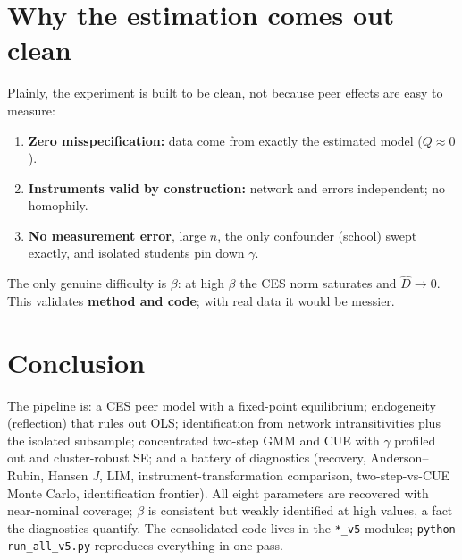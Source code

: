 \documentclass[11pt]{article}
\begin{document}
\section{Why the estimation comes out clean}
Plainly, the experiment is built to be clean, not because peer effects are easy to measure:
\begin{enumerate}\itemsep2pt
\item \textbf{Zero misspecification:} data come from exactly the estimated model ($Q\approx0$).
\item \textbf{Instruments valid by construction:} network and errors independent; no homophily.
\item \textbf{No measurement error}, large $n$, the only confounder (school) swept exactly, and isolated students pin down $\gamma$.
\end{enumerate}
The only genuine difficulty is $\beta$: at high $\beta$ the CES norm saturates and $\widehat D\to 0$. This validates \textbf{method and code}; with real data it would be messier.

\section{Conclusion}
The pipeline is: a CES peer model with a fixed-point equilibrium; endogeneity (reflection) that rules out OLS; identification from network intransitivities plus the isolated subsample; concentrated two-step GMM and CUE with $\gamma$ profiled out and cluster-robust SE; and a battery of diagnostics (recovery, Anderson--Rubin, Hansen $J$, LIM, instrument-transformation comparison, two-step-vs-CUE Monte Carlo, identification frontier). All eight parameters are recovered with near-nominal coverage; $\beta$ is consistent but weakly identified at high values, a fact the diagnostics quantify. The consolidated code lives in the \texttt{*\_v5} modules; \texttt{python run\_all\_v5.py} reproduces everything in one pass.
\end{document}

